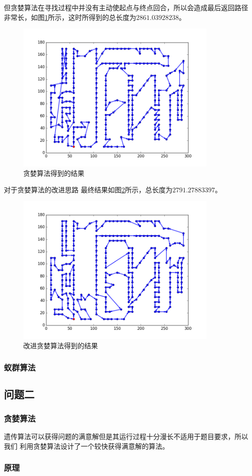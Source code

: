 \documentclass[fontset=windows,a4paper,12pt]{ctexart}
\begin{document}
         但贪婪算法在寻找过程中并没有主动使起点与终点回合，所以会造成最后返回路径非常长，如图\ref{fig:fail}所示，这时所得到的总长度为$2861.03928238$。
         \begin{figure}[htbp]
            \centering
            \includegraphics[width=10cm]{pic/greedy_fail.png}
            \caption{贪婪算法得到的结果}
            \label{fig:fail}
        \end{figure}
        
        对于贪婪算法的改进思路
        最终结果如图\ref{fig:greedy}所示，总长度为$2791.27883397$。
		\begin{figure}[htbp]
			\centering
			\includegraphics[width=10cm]{pic/greedy_result.png}
			\caption{改进贪婪算法得到的结果}
			\label{fig:greedy}
		\end{figure}
	   \subsubsection{蚁群算法}
    \subsection{问题二}
      \subsubsection{贪婪算法}
        遗传算法可以获得问题的满意解但是其运行过程十分漫长不适用于题目要求，所以我们
        利用贪婪算法设计了一个较快获得满意解的算法。
      \subsubsection{原理}
        
  
  
\end{document}
